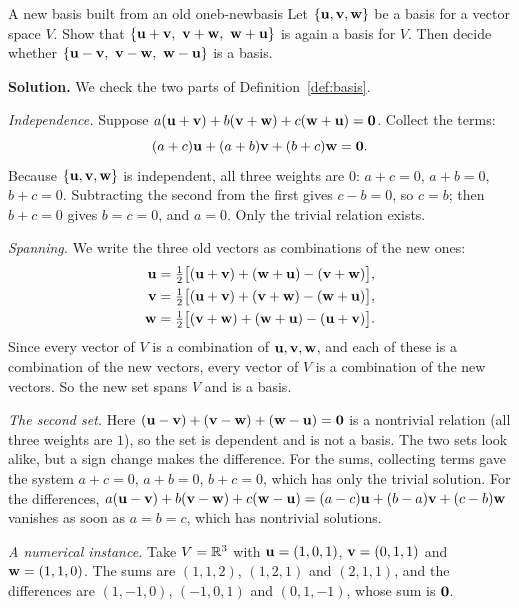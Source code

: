 \documentclass[11pt]{article}
\begin{document}
\begin{exmp}{A new basis built from an old one}{b-newbasis}
Let $\{\mathbf{u},\mathbf{v},\mathbf{w}\}$ be a basis for a vector space $V$. Show that $\{\bv{u}+\bv{v},\ \bv{v}+\bv{w},\ \bv{w}+\bv{u}\}$ is again a basis for $V$. Then decide whether $\{\bv{u}-\bv{v},\ \bv{v}-\bv{w},\ \bv{w}-\bv{u}\}$ is a basis.

\textbf{Solution.} We check the two parts of Definition~\ref{def:basis}.

\emph{Independence.} Suppose $a(\mathbf{u}+\mathbf{v})+b(\mathbf{v}+\mathbf{w})+c(\mathbf{w}+\mathbf{u})=\mathbf{0}$. Collect the terms:
\[
(a+c)\mathbf{u}+(a+b)\mathbf{v}+(b+c)\mathbf{w}=\mathbf{0}.
\]
Because $\{\mathbf{u},\mathbf{v},\mathbf{w}\}$ is independent, all three weights are $0$: $a+c=0$, $a+b=0$, $b+c=0$. Subtracting the second from the first gives $c-b=0$, so $c=b$; then $b+c=0$ gives $b=c=0$, and $a=0$. Only the trivial relation exists.

\emph{Spanning.} We write the three old vectors as combinations of the new ones:
\begin{align*}
\mathbf{u}&=\tfrac12\big[(\mathbf{u}+\mathbf{v})+(\mathbf{w}+\mathbf{u})-(\mathbf{v}+\mathbf{w})\big],\\
\mathbf{v}&=\tfrac12\big[(\mathbf{u}+\mathbf{v})+(\mathbf{v}+\mathbf{w})-(\mathbf{w}+\mathbf{u})\big],\\
\mathbf{w}&=\tfrac12\big[(\mathbf{v}+\mathbf{w})+(\mathbf{w}+\mathbf{u})-(\mathbf{u}+\mathbf{v})\big].
\end{align*}
Since every vector of $V$ is a combination of $\mathbf{u},\mathbf{v},\mathbf{w}$, and each of these is a combination of the new vectors, every vector of $V$ is a combination of the new vectors. So the new set spans $V$ and is a basis.

\emph{The second set.} Here $(\mathbf{u}-\mathbf{v})+(\mathbf{v}-\mathbf{w})+(\mathbf{w}-\mathbf{u})=\mathbf{0}$ is a nontrivial relation (all three weights are $1$), so the set is dependent and is not a basis. The two sets look alike, but a sign change makes the difference. For the sums, collecting terms gave the system $a+c=0$, $a+b=0$, $b+c=0$, which has only the trivial solution. For the differences, $a(\mathbf{u}-\mathbf{v})+b(\mathbf{v}-\mathbf{w})+c(\mathbf{w}-\mathbf{u})=(a-c)\mathbf{u}+(b-a)\mathbf{v}+(c-b)\mathbf{w}$ vanishes as soon as $a=b=c$, which has nontrivial solutions.

\emph{A numerical instance.} Take $V=\mathbb{R}^3$ with $\mathbf{u}=(1,0,1)$, $\mathbf{v}=(0,1,1)$ and $\mathbf{w}=(1,1,0)$. The sums are $(1,1,2)$, $(1,2,1)$ and $(2,1,1)$, and the differences are $(1,-1,0)$, $(-1,0,1)$ and $(0,1,-1)$, whose sum is $\mathbf{0}$.
\end{exmp}
\end{document}
